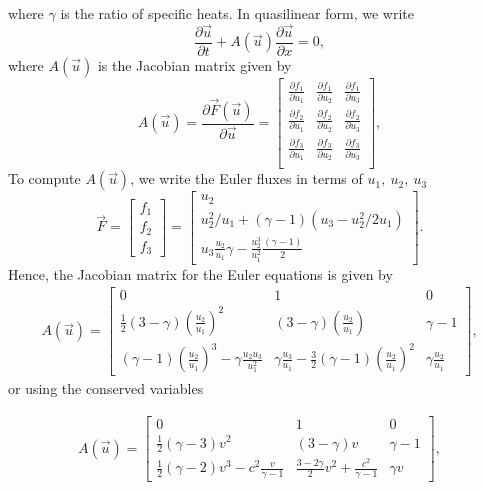 where $\gamma$ is the ratio of specific heats. In quasilinear form, we write 
\begin{equation}
	\frac{\partial \vec u}{\partial t} + A(\vec u) \frac{\partial \vec u}{\partial x} = 0,
\end{equation}
where $A(\vec u)$ is the Jacobian matrix given by
\begin{equation}
	A(\vec u) = \frac{\partial \vec F(\vec u)}{\partial \vec u} =
	\begin{bmatrix}
	\frac{\partial f_1}{\partial u_1} & \frac{\partial f_1}{\partial u_2} & \frac{\partial f_1}{\partial u_3} \\
	\frac{\partial f_2}{\partial u_1} & \frac{\partial f_2}{\partial u_2} & \frac{\partial f_2}{\partial u_3} \\
	\frac{\partial f_3}{\partial u_1} & \frac{\partial f_3}{\partial u_2} & \frac{\partial f_3}{\partial u_3} \\
	\end{bmatrix},
\end{equation}
To compute $A(\vec u)$, we write the Euler fluxes in terms of $u_1,~u_2,~u_3$
\begin{equation}
	\vec F = 
	\begin{bmatrix}
		f_1 \\ f_2 \\ f_3
	\end{bmatrix}
	= 
	\begin{bmatrix}
		u_2 \\ u_2^2/u_1 + (\gamma-1)(u_3-u_2^2/2 u_1) \\ u_3 \frac{u_2}{u_1} \gamma - \frac{u_2^3}{u_1^2}\frac{(\gamma-1)}{2} 
	\end{bmatrix}.
\end{equation}
Hence, the Jacobian matrix for the Euler equations is given by
\begin{align}
	A(\vec u) = 
	\begin{bmatrix}
		0 & 1 & 0 \\
		\frac{1}{2}(3-\gamma)\left(\frac{u_2}{u_1}\right)^2 & (3-\gamma)\left(\frac{u_2}{u_1}\right) & \gamma-1 \\
		(\gamma-1) \left(\frac{u_2}{u_1}\right)^3 - \gamma \frac{u_2 u_3}{u_1^2} & \gamma \frac{u_3}{u_1}-\frac{3}{2}(\gamma-1)\left(\frac{u_2}{u_1}\right)^2 & \gamma \frac{u_2}{u_1}
	\end{bmatrix},
\end{align}
or using the conserved variables
\begin{eqBox}
	\begin{align}
		A(\vec u) = 
		\begin{bmatrix}
			0 & 1 & 0 \\
			\frac{1}{2} (\gamma-3)v^2 & (3-\gamma)v & \gamma-1 \\ 
			\frac{1}{2} (\gamma-2) v^3 - c^2 \frac{v}{\gamma-1} & \frac{3-2\gamma}{2}v^2 + \frac{c^2}{\gamma-1} & \gamma v
		\end{bmatrix},
		\label{eq:eulerjacobian}
	\end{align}
\end{eqBox}
